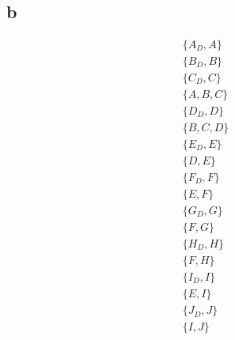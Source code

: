 \documentclass{article}
\begin{document}
~\\
~\\
~\\
~\\
~\\
~\\
~\\
~\\
~\\
~\\
~\\
~\\
~\\
~\\
~\\
~\\
~\\
~\\
~\\
~\\
~\\
~\\
~\\
~\\
~\\
~\\
~\\
~\\
~\\
~\\
~\\
~\\
~\\
~\\
~\\
~\\
~\\
~\\
~\\
~\\
~\\

\subsection{b}

\begin{align*}
\{A_D, A\} \\
\{B_D, B\} \\
\{C_D, C\} \\
\{A, B, C\} \\
\{D_D, D\} \\
\{B, C, D\} \\
\{E_D, E\} \\
\{D, E\} \\
\{F_D, F\} \\
\{E, F\} \\
\{G_D, G\} \\
\{F, G\} \\
\{H_D, H\} \\
\{F, H\} \\
\{I_D, I\} \\
\{E, I\} \\
\{J_D, J\} \\
\{I, J\}
\end{align*}
\end{document}
